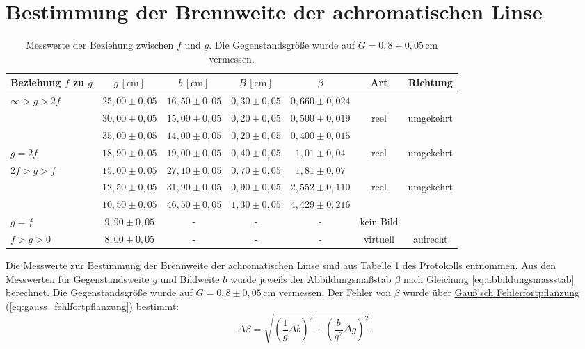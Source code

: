 \twocolumn



\section{Bestimmung der Brennweite der achromatischen Linse}
\label{sec:auswertung_brennweite_achromat}

\begin{table}[t!]
    \centering
    \begin{tabular}{l | c c c c | c c}
        \hline
        Beziehung $f$ zu $g$ & $g \,[\mathrm{cm}]$ & $b \,[\mathrm{cm}]$ & $B \,[\mathrm{cm}]$ & $\beta$ & Art & Richtung \\
        \hline
        $\infty > g > 2f$ & $25,00 \pm 0,05$ & $16,50 \pm 0,05$ & $0,30 \pm 0,05$ & $0,660 \pm 0,024$ \\
        & $30,00 \pm 0,05$ & $15,00 \pm 0,05$ & $0,20 \pm 0,05$ & $0,500 \pm 0,019$ & reel & umgekehrt  \\
        & $35,00 \pm 0,05$ & $14,00 \pm 0,05$ & $0,20 \pm 0,05$ & $0,400 \pm 0,015$ \\
        \midrule
        $g = 2f$ & $18,90 \pm 0,05$ & $19,00 \pm 0,05$ & $0,40 \pm 0,05$ & $1,01 \pm 0,04$ & reel & umgekehrt \\
        \midrule
        $2f > g > f$ & $15,00 \pm 0,05$ & $27,10 \pm 0,05$ & $0,70 \pm 0,05$ & $1,81 \pm 0,07$ \\
        & $12,50 \pm 0,05$ & $31,90 \pm 0,05$ & $0,90 \pm 0,05$ & $2,552 \pm 0,110$ & reel & umgekehrt  \\
        & $10,50 \pm 0,05$ & $46,50 \pm 0,05$ & $1,30 \pm 0,05$ & $4,429 \pm 0,216$ \\
        \midrule
        $g = f$ & $9,90 \pm 0,05$ & - & - & - & kein Bild \\
        \midrule
        $f > g > 0$ & $8,00 \pm 0,05$ & - & - & - & virtuell & aufrecht \\
        \bottomrule
    \end{tabular}
    \caption{Messwerte der Beziehung zwischen $f$ und $g$. Die Gegenstandsgröße wurde auf $G = 0{,}8 \pm 0{,}05\,\mathrm{cm}$ vermessen.}
    \label{tab:messwerte_achromat}
\end{table}

Die Messwerte zur Bestimmung der Brennweite der achromatischen Linse sind aus Tabelle 1 des \hyperref[Protokoll]{Protokolls} entnommen. Aus den Messwerten für Gegenstandsweite $g$ und Bildweite $b$ wurde jeweils der Abbildungsmaßstab $\beta$ nach \hyperref[eq:abbildungsmassstab]{Gleichung \ref*{eq:abbildungsmassstab}} berechnet. Die Gegenstandsgröße wurde auf $G = 0{,}8 \pm 0{,}05\,\mathrm{cm}$ vermessen. Der Fehler von $\beta$ wurde über \hyperref[eq:gauss_fehlfortpflanzung]{Gauß'sch Fehlerfortpflanzung (\ref*{eq:gauss_fehlfortpflanzung})} bestimmt:
\begin{equation}
    \Delta \beta = \sqrt{\left(\frac{1}{g} \Delta b\right)^2 + \left(\frac{b}{g^2} \Delta g\right)^2}.
\end{equation}


